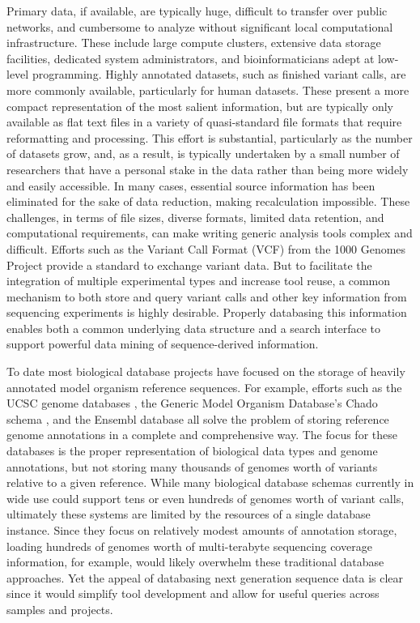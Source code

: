 \documentclass[10pt]{bmc_article}
\newenvironment{bmcformat}{\begin{raggedright}\baselineskip20pt\sloppy\setboolean{publ}{false}}{\end{raggedright}\baselineskip20pt\sloppy}
\begin{document}
\begin{bmcformat}
Primary data, if available, are typically huge, difficult to transfer over public networks, and cumbersome to analyze without significant local computational infrastructure. These include large compute clusters, extensive data storage facilities, dedicated system administrators, and bioinformaticians adept at low-level programming. Highly annotated datasets, such as finished variant calls, are more commonly available, particularly for human datasets. These present a more compact representation of the most salient information, but are typically only available as flat text files in a variety of quasi-standard file formats that require reformatting and processing. This effort is substantial, particularly as the number of datasets grow, and, as a result, is typically undertaken by a small number of researchers that have a personal stake in the data rather than being more widely and easily accessible.  In many cases, essential source information has been eliminated for the sake of data reduction, making recalculation impossible. These challenges, in terms of file sizes, diverse formats, limited data retention, and computational requirements, can make writing generic analysis tools complex and difficult. Efforts such as the Variant Call Format (VCF) from the 1000 Genomes Project provide a standard to exchange variant data. But to facilitate the integration of multiple experimental types and increase tool reuse, a common mechanism to both store and query variant calls and other key information from sequencing experiments is highly desirable.  Properly databasing this information enables both a common underlying data structure and a search interface to support powerful data mining of sequence-derived information.

To date most biological database projects have focused on the storage of heavily annotated model organism reference sequences. For example, efforts such as the UCSC genome databases \cite{rhead2009ucsc}, the Generic Model Organism Database’s Chado schema \cite{mungall2007chado}, and the Ensembl database \cite{hubbard2006ensembl} all solve the problem of storing reference genome annotations in a complete and comprehensive way. The focus for these databases is the proper representation of biological data types and genome annotations, but not storing many thousands of genomes worth of variants relative to a given reference. While many biological database schemas currently in wide use could support tens or even hundreds of genomes worth of variant calls, ultimately these systems are limited by the resources of a single database instance. Since they focus on relatively modest amounts of annotation storage, loading hundreds of genomes worth of multi-terabyte sequencing coverage information, for example, would likely overwhelm these traditional database approaches. Yet the appeal of databasing next generation sequence data is clear since it would simplify tool development and allow for useful queries across samples and projects.


\end{bmcformat}
\end{document}
